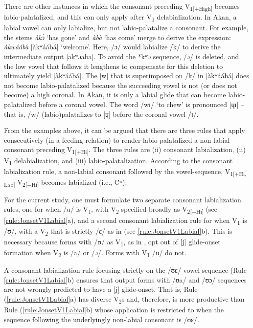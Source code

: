 \documentclass[output=paper,colorlinks,citecolor=brown]{langscibook}
\begin{document}
There are other instances in which the consonant preceding V\textsubscript{1[+High]} becomes labio-palatalized, and this can only apply after V\textsubscript{1} delabialization. In Akan, a labial vowel can only labialize, but not labio-palatalize a consonant. For example, the stems \textit{àkɔ́} ‘has gone’ and \textit{àba}́ ‘has come’ merge to derive the expression:\textit{ àkwáába}́ [àkʷáábá] ‘welcome'. Here, /ɔ/ would labialize /k/ to derive the intermediate output |akʷɔaba|. To avoid the *kʷɔ sequence, /ɔ/ is deleted, and the low vowel that follows it  lengthens to compensate for this deletion to ultimately yield [àkʷáábá]. The [w] that is superimposed on /k/ in [àkʷáábá] does not become labio-palatalized because the succeeding vowel is not (or does not become) a high coronal. In Akan, it is only a labial glide that can become labio-palatalized before a coronal vowel. The word /wɪ/ ‘to chew’ is pronounced [ɥɪ] – that is, /w/ (labio)palatalizes to [ɥ] before the coronal vowel /ɪ/. 

From the examples above, it can be argued that there are three rules that apply consecutively (in a feeding relation)  to render labio-palatalized a non-labial consonant preceding V\textsubscript{1[+Hi]}. The three rules are (ii) consonant labialization, (ii) V\textsubscript{1} delabialization, and (iii) labio-palatalization. According to the consonant labialization rule, a non-labial consonant followed by the vowel-sequence, V\textsubscript{1[+Hi, Lab]} V\textsubscript{2[−Hi]} becomes labialized (i.e., Cʷ). 

For the current study, one must formulate two separate consonant labialization rules, one for when /u/ is V\textsubscript{1}, with V\textsubscript{2} specified broadly as V\textsubscript{2[−Hi]} (see \ref{rule:JonsetV1Labial}a), and a second consonant labialization rule for when V\textsubscript{1} is /ʊ/, with a V\textsubscript{2} that is strictly /ɛ/ as in (see \ref{rule:JonsetV1Labial}b). This is necessary because forms with /ʊ/ as V\textsubscript{1}, as in , opt out of [j] glide-onset formation when V\textsubscript{2} is /a/ or /ɔ/. Forms with V\textsubscript{1} /u/ do not.

A consonant labialization rule focusing strictly on the /ʊɛ/ vowel sequence (Rule \ref{rule:JonsetV1Labial}b) ensures that output forms with /ʊa/ and /ʊɔ/ sequences are not wrongly predicted to have a [j] glide-onset. That is, Rule (\ref{rule:JonsetV1Labial}a) has diverse V\textsubscript{2}s and, therefore, is more productive than Rule (\ref{rule:JonsetV1Labial}b) whose application is restricted to when the sequence following the underlyingly non-labial consonant is /ʊɛ/.     
\end{document}
